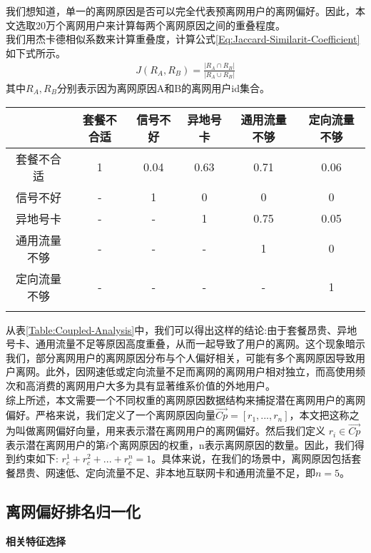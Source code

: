 我们想知道，单一的离网原因是否可以完全代表预离网用户的离网偏好。因此，本文选取20万个离网用户来计算每两个离网原因之间的重叠程度。\\
我们用杰卡德相似系数来计算重叠度，计算公式\eqref{Eq:Jaccard-Similarit-Coefficient}如下式所示。
\begin{equation}
	\begin{aligned}
		J(R_{A}, R_{B}) = \frac{| R_{A} \cap R_{B} |}{| R_{A} \cup R_{B} |}
	\end{aligned}
	\label{Eq:Jaccard-Similarit-Coefficient}
\end{equation}
其中$R_{A},  R_{B}$分别表示因为离网原因A和B的离网用户id集合。


\begin{tabular}{cccccc}
	\toprule
	\ & 套餐不合适 & 信号不好 & 异地号卡 & 通用流量不够 & 定向流量不够 \\
	\midrule
	套餐不合适 & 1 & 0.04  & 0.63 & 0.71 & 0.06 \\
	信号不好 & - & 1 & 0 & 0 & 0 \\
	异地号卡 & - & - & 1 & 0.75 & 0.05 \\
	通用流量不够 & - & - & - & 1 & 0 \\
	定向流量不够 & - & -  & - & - & 1 \\
	\bottomrule
	\label{Table:Coupled-Analysis}
\end{tabular}

从表\ref{Table:Coupled-Analysis}中，我们可以得出这样的结论:由于套餐昂贵、异地号卡、通用流量不足等原因高度重叠，从而一起导致了用户的离网。这个现象暗示我们，部分离网用户的离网原因分布与个人偏好相关，可能有多个离网原因导致用户离网。此外，因网速低或定向流量不足而离网的离网用户相对独立，而高使用频次和高消费的离网用户大多为具有显著维系价值的外地用户。\\
综上所述，本文需要一个不同权重的离网原因数据结构来捕捉潜在离网用户的离网偏好。严格来说，我们定义了一个离网原因向量$\overrightarrow{C p} = [r_{1}, ..., r_{n}]$，本文把这称之为叫做离网偏好向量，用来表示潜在离网用户的离网偏好。然后我们定义 $r_{i} \in \overrightarrow{C p}$ 表示潜在离网用户的第$i$个离网原因的权重，n表示离网原因的数量。因此，我们得到约束如下: $r^{1}_{c} + r^{2}_{c} + ... +r^{n}_{c} = 1$。具体来说，在我们的场景中，离网原因包括套餐昂贵、网速低、定向流量不足、非本地互联网卡和通用流量不足，即$n = 5$。


\subsection{离网偏好排名归一化}
\textbf{相关特征选择}\\

